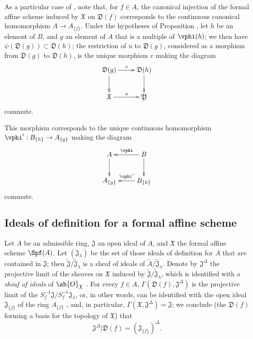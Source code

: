 \begin{env}[10.2.3]
\label{I.10.2.3}
As a particular case of , note that, for $f\in A$, the canonical injection of the formal affine scheme induced by $\mathfrak{X}$ on $\mathfrak{D}(f)$ corresponds to the continuous canonical homomorphism $A\to A_{\{f\}}$.
Under the hypotheses of Proposition , let $h$ be an element of $B$, and $g$ an element of $A$ that is a multiple of $\vphi(h)$;
we then have $\psi(\mathfrak{D}(g))\subset\mathfrak{D}(h)$; the restriction of $u$ to $\mathfrak{D}(g)$, considered as a morphism from $\mathfrak{D}(g)$ to $\mathfrak{D}(h)$, is the unique morphism $v$ making the diagram
\[
  \xymatrix{
    \mathfrak{D}(g)\ar[r]^v\ar[d] &
    \mathfrak{D}(h)\ar[d]\\
    \mathfrak{X}\ar[r]^u &
    \mathfrak{Y}
  }
\]
commute.

This morphism corresponds to the unique continuous homomorphism $\vphi':B_{\{h\}}\to A_{\{g\}}$  making the diagram
\[
  \xymatrix{
    A\ar[d] &
    B\ar[l]_\vphi\ar[d]\\
    A_{\{g\}} &
    B_{\{h\}}\ar[l]_{\vphi'}
  }
\]
commute.
\end{env}

\subsection{Ideals of definition for a formal affine scheme}
\label{subsection:I.10.3}

\begin{env}[10.3.1]
\label{I.10.3.1}
Let $A$ be an admissible ring, $\mathfrak{J}$ an open ideal of $A$, and $\mathfrak{X}$ the formal affine scheme $\Spf(A)$.
Let $(\mathfrak{J}_\lambda)$ be the set of those ideals of definition for $A$ that are contained in $\mathfrak{J}$; then $\widetilde{\mathfrak{J}}/\widetilde{\mathfrak{J}}_\lambda$ is a sheaf of ideals of $\widetilde{A}/\widetilde{\mathfrak{J}}_\lambda$.
Denote by $\mathfrak{J}^\Delta$ the projective limit of the sheaves on $\mathfrak{X}$ induced by $\widetilde{\mathfrak{J}}/\widetilde{\mathfrak{J}}_\lambda$, which is identified with a \emph{sheaf of ideals} of $\sh{O}_\mathfrak{X}$ .
For every $f\in A$, $\Gamma(\mathfrak{D}(f),\mathfrak{J}^\Delta)$ is the projective limit of the $S_f^{-1}\mathfrak{J}/S_f^{-1}\mathfrak{J}_\lambda$, or, in other words, can be identified with the open ideal $\mathfrak{J}_{\{f\}}$ of the ring $A_{\{f\}}$ , and, in particular, $\Gamma(\mathfrak{X},\mathfrak{J}^\Delta)=\mathfrak{J}$; we conclude (the $\mathfrak{D}(f)$ forming a basis for the topology of $\mathfrak{X}$) that
\[
\label{I.10.3.1.1}
  \mathfrak{J}^\Delta|\mathfrak{D}(f)=(\mathfrak{J}_{\{f\}})^\Delta.
  \tag{10.3.1.1}
\]
\end{env}

